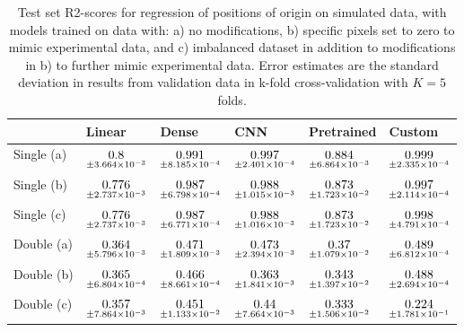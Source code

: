\begin{table}
\centering
\caption{
Test set R2-scores for regression of positions of origin on simulated data, with models trained on data with: 
a) no modifications, b) specific pixels set to zero to mimic experimental data, and c) imbalanced dataset
in addition to modifications in b) to further mimic experimental data. Error estimates are the standard deviation 
in results from validation data in k-fold cross-validation with $K=5$ folds.
}
\label{tab:regression-simulated-all-positions-r2}
\begin{tabular}{llllll}
\toprule
{} &                                              Linear &                                               Dense &                                                 CNN &                                          Pretrained &                                              Custom \\
\midrule
Single (a) &  $\underset{\num{+- 3.664e-03 }  }{\num{ 0.8 } }$ &  $\underset{\num{+- 8.185e-04 }  }{\num{ 0.991 } }$ &  $\underset{\num{+- 2.401e-04 }  }{\num{ 0.997 } }$ &  $\underset{\num{+- 6.864e-03 }  }{\num{ 0.884 } }$ &  $\underset{\num{+- 2.335e-04 }  }{\num{ 0.999 } }$ \\
Single (b) &  $\underset{\num{+- 2.737e-03 }  }{\num{ 0.776 } }$ &  $\underset{\num{+- 6.798e-04 }  }{\num{ 0.987 } }$ &  $\underset{\num{+- 1.015e-03 }  }{\num{ 0.988 } }$ &  $\underset{\num{+- 1.723e-02 }  }{\num{ 0.873 } }$ &  $\underset{\num{+- 2.114e-04 }  }{\num{ 0.997 } }$ \\
Single (c) &  $\underset{\num{+- 2.737e-03 }  }{\num{ 0.776 } }$ &  $\underset{\num{+- 6.771e-04 }  }{\num{ 0.987 } }$ &  $\underset{\num{+- 1.016e-03 }  }{\num{ 0.988 } }$ &  $\underset{\num{+- 1.723e-02 }  }{\num{ 0.873 } }$ &  $\underset{\num{+- 4.791e-04 }  }{\num{ 0.998 } }$ \\
Double (a) &  $\underset{\num{+- 5.796e-03 }  }{\num{ 0.364 } }$ &  $\underset{\num{+- 1.809e-03 }  }{\num{ 0.471 } }$ &  $\underset{\num{+- 2.394e-03 }  }{\num{ 0.473 } }$ &  $\underset{\num{+- 1.079e-02 }  }{\num{ 0.37 } }$ &  $\underset{\num{+- 6.812e-04 }  }{\num{ 0.489 } }$ \\
Double (b) &  $\underset{\num{+- 6.804e-04 }  }{\num{ 0.365 } }$ &  $\underset{\num{+- 8.661e-04 }  }{\num{ 0.466 } }$ &  $\underset{\num{+- 1.841e-03 }  }{\num{ 0.363 } }$ &  $\underset{\num{+- 1.397e-02 }  }{\num{ 0.343 } }$ &  $\underset{\num{+- 2.694e-04 }  }{\num{ 0.488 } }$ \\
Double (c) &  $\underset{\num{+- 7.864e-03 }  }{\num{ 0.357 } }$ &  $\underset{\num{+- 1.133e-02 }  }{\num{ 0.451 } }$ &  $\underset{\num{+- 7.664e-03 }  }{\num{ 0.44 } }$ &  $\underset{\num{+- 1.506e-02 }  }{\num{ 0.333 } }$ &  $\underset{\num{+- 1.781e-01 }  }{\num{ 0.224 } }$ \\
\bottomrule
\end{tabular}
\end{table}
